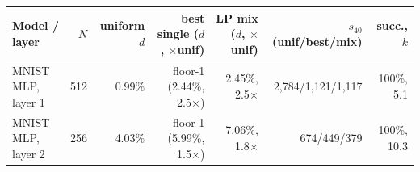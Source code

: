 \begin{tabular}{@{}lrrrrrr@{}}
\toprule
Model / layer & $N$ & uniform $d$ & best single ($d$, $\times$unif) & LP mix ($d$, $\times$unif) & $s_{40}$ (unif/best/mix) & succ., $\bar k$ \\
\midrule
MNIST MLP, layer 1 & 512 & 0.99\% & floor-1 (2.44\%, 2.5$\times$) & 2.45\%, 2.5$\times$ & 2,784/1,121/1,117 & 100\%, 5.1 \\
MNIST MLP, layer 2 & 256 & 4.03\% & floor-1 (5.99\%, 1.5$\times$) & 7.06\%, 1.8$\times$ & 674/449/379 & 100\%, 10.3 \\
\bottomrule
\end{tabular}
